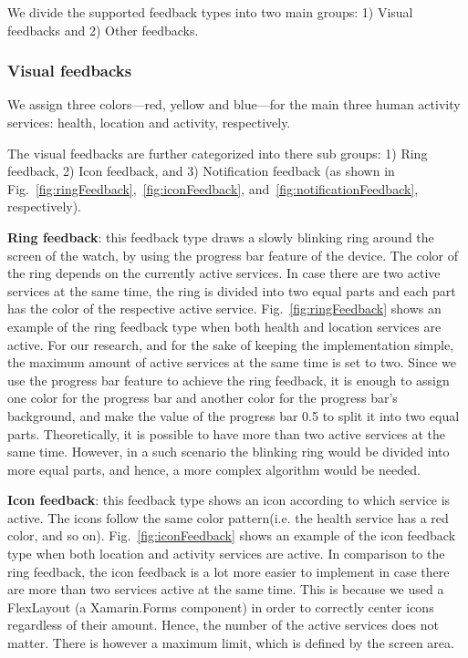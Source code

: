 \documentclass[conference, a4paper, 10pt, twocolumn]{IEEEtran}
\begin{document}
We divide the supported feedback types into two main groups: 1) Visual feedbacks and 2) Other feedbacks.

\subsubsection{\textbf{Visual feedbacks}}
We assign three colors---red, yellow and blue---for the main three human activity services: health, location and activity, respectively.

The visual feedbacks are further categorized into there sub groups: 1) Ring feedback, 2) Icon feedback, and 3) Notification feedback (as shown in Fig.~\ref{fig:ringFeedback},~\ref{fig:iconFeedback}, and~\ref{fig:notificationFeedback}, respectively).

\textbf{Ring feedback}: this feedback type draws a slowly blinking ring around the screen of the watch, by using the progress bar feature of the device. The color of the ring depends on the currently active services. In case there are two active services at the same time, the ring is divided into two equal parts and each part has the color of the respective active service. Fig.~\ref{fig:ringFeedback} shows an example of the ring feedback type when both health and location services are active. For our research, and for the sake of keeping the implementation simple, the maximum amount of active services at the same time is set to two. Since we use the progress bar feature to achieve the ring feedback, it is enough to assign one color for the progress bar and another color for the progress bar's background, and make the value of the progress bar 0.5 to split it into two equal parts. Theoretically, it is possible to have more than two active services at the same time. However, in a such scenario the blinking ring would be divided into more equal parts, and hence, a more complex algorithm would be needed. 

\textbf{Icon feedback}: this feedback type shows an icon according to which service is active. The icons follow the same color pattern(i.e. the health service has a red color, and so on). Fig.~\ref{fig:iconFeedback} shows an example of the icon feedback type when both location and activity services are active. In comparison to the ring feedback, the icon feedback is a lot more easier to implement in case there are more than two services active at the same time. This is because we used a FlexLayout (a Xamarin.Forms component) in order to correctly center icons regardless of their amount. Hence, the number of the active services does not matter. There is however a maximum limit, which is defined by the screen area.
\end{document}
